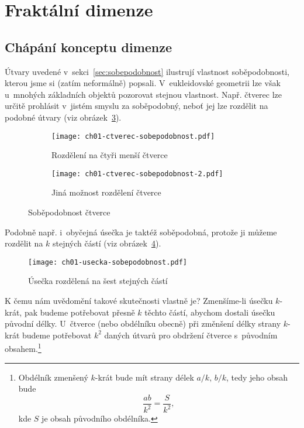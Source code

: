 \section{Fraktální dimenze}\label{sec:fraktalni_dimenze}

\subsection{Chápání konceptu dimenze}\label{subsec:koncept-dimenze}

Útvary uvedené v~sekci~\ref{sec:sobepodobnost} ilustrují vlastnost soběpodobnosti, kterou jsme si (zatím neformálně) popsali. V~eukleidovské geometrii lze však u~mnohých základních objektů pozorovat stejnou vlastnost. Např. čtverec lze určitě prohlásit v~jistém smyslu za soběpodobný, neboť jej lze rozdělit na podobné útvary (viz obrázek~\ref{fig:sobepodobnost-ctverce}).
\begin{figure}[h]
    \centering
    \begin{subfigure}[b]{\subfigwidth}
        \centering
        \texttt{[image: ch01-ctverec-sobepodobnost.pdf]}
        \caption{Rozdělení na čtyři menší čtverce}
        \label{subfig:sobepodobnost-ctverce-1}
    \end{subfigure}
    \begin{subfigure}[b]{\subfigwidth}
        \centering
        \texttt{[image: ch01-ctverec-sobepodobnost-2.pdf]}
        \caption{Jiná možnost rozdělení čtverce}
        \label{subfig:sobepodobnost-ctverce-2}
    \end{subfigure}
    \caption{Soběpodobnost čtverce}
    \label{fig:sobepodobnost-ctverce}
\end{figure}
Podobně např. i~obyčejná úsečka je taktéž soběpodobná, protože ji můžeme rozdělit na $k$ stejných částí (viz obrázek~\ref*{fig:sobepodobnost-usecky}).\par
\begin{figure}[h]
    \centering
    \texttt{[image: ch01-usecka-sobepodobnost.pdf]}
    \caption{Úsečka rozdělená na šest stejných částí}
    \label{fig:sobepodobnost-usecky}
\end{figure}
K čemu nám uvědomění takové skutečnosti vlastně je? Zmenšíme-li úsečku $k$-krát, pak budeme potřebovat přesně $k$ těchto částí, abychom dostali úsečku původní délky. U~čtverce (nebo obdélníku obecně) při změnšení délky strany $k$-krát budeme potřebovat $k^2$ daných útvarů pro obdržení čtverce s~původním obsahem.\footnote{Obdélník zmenšený $k$-krát bude mít strany délek $a/k,\,b/k$, tedy jeho obsah bude
\[\dfrac{ab}{k^2}=\dfrac{S}{k^2},\]
kde $S$ je obsah původního obdélníka.}

